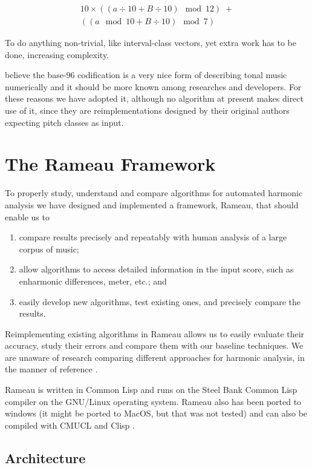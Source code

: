 \documentclass{article}
\begin{document}
\begin{eqnarray}
10\times((a \div 10 + B \div 10) \mod 12)\; + \nonumber \\
((a \mod 10 + B \div 10) \mod 7)
\end{eqnarray}

To do anything non-trivial, like interval-class vectors, yet extra
work has to be done, increasing complexity.

believe the base-96 codification is a very nice form of describing
tonal music numerically and it should be more known among researches
and developers. For these reasons we have adopted it, although no
algorithm at present makes direct use of it, since they are
reimplementations designed by their original authors expecting pitch
classes as input. 

\section{The Rameau Framework}
\label{sec:system}

To properly study, understand and compare algorithms for automated
harmonic analysis we have designed and implemented a framework,
Rameau, that should enable us to

\begin{enumerate}
\item compare results precisely and repeatably with human analysis of
  a large corpus of music;
\item allow algorithms to access detailed information in the input score,
  such as enharmonic differences, meter, etc.; and
\item easily develop new algorithms, test existing ones, and precisely
  compare the results.
\end{enumerate}

Reimplementing existing algorithms in Rameau allows us to easily
evaluate their accuracy, study their errors and compare them with our
baseline techniques. We are unaware of research comparing different
approaches for harmonic analysis, in the manner of reference
\cite{gomez.ea:song}.

Rameau is written in Common Lisp and runs on the Steel Bank Common
Lisp \cite{team:sbcl} compiler on the GNU/Linux operating system.
Rameau also has been ported to windows (it might be ported to MacOS,
but that was not tested) and can also be compiled with CMUCL
\cite{maclachlan:cmucl} and Clisp \cite{haible.ea:clisp}.

\subsection{Architecture}
\label{sec:architecture-and-api}
\end{document}
